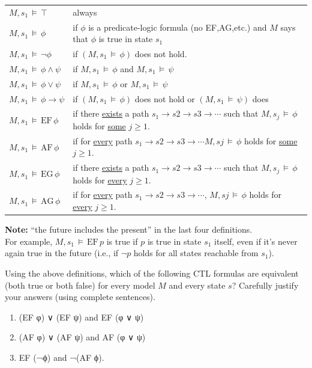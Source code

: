\documentclass[12pt,letterpaper,boxed,cm]{hmcpset}
\newcommand{\ra}[0]{\rightarrow}
\newcommand{\turn}[0]{\,\vDash\,}
\newcommand{\EF}[0]{\text{EF}\,}
\newcommand{\AF}[0]{\text{AF}\,}
\newcommand{\EG}[0]{\text{EG}\,}
\newcommand{\AG}[0]{\text{AG}\,}
\begin{document}
\begin{center}
    \begin{tabular}{l l}
        $M, s_1 \turn \top$           & always \\
        $M,s_1 \turn \phi$            & if $\phi$ is a predicate-logic formula (no EF,AG,etc.)
                                       and $M$ says that $\phi$ is true in state $s_1$ \\
        $M,s_1 \turn \neg\phi$        & if $(M,s_1 \turn \phi)$ does not hold. \\
        $M,s_1 \turn \phi \land \psi$ & if $M,s_1 \turn \phi$ and $M,s_1 \turn \psi$ \\
        $M,s_1 \turn \phi \lor \psi$  & if $ M,s_1 \turn \phi$ or $ M,s_1 \turn \psi$ \\
        $M,s_1 \turn \phi \ra \psi$   & if $(M,s_1 \turn \phi)$ does not hold or $(M,s_1 \turn \psi)$ does \\
        $M,s_1 \turn \EF \phi$        & if there \ul{exists} a path $s_1 \ra s2 \ra s3 \ra \cdots$  such that
                                       $M,s_j \turn \phi$  holds for \ul{some} $j \ge 1$. \\
        $M,s_1 \turn \AF \phi$        & if for \ul{every} path $s_1 \ra s2 \ra s3 \ra \cdots M,sj \turn \phi$ 
                                       holds for \ul{some} $j \ge 1$. \\
        $M,s_1 \turn \EG \phi$        & if there \ul{exists} a path $s_1 \ra s2 \ra s3 \ra \cdots$  such that
                                       $M,s_j \turn \phi$  holds for \ul{every} $j \ge 1$. \\
        $M,s_1 \turn \AG \phi$        & if for \ul{every} path $s_1 \ra s2 \ra s3 \ra \cdots$,  $M,sj \turn \phi$  
                                       holds for \ul{every} $j \ge 1$.
    \end{tabular}
\end{center}

\textbf{Note:}  ``the future includes the present'' in the last four definitions.\\
For example, $M,s_1 \turn \EF p$  is true if $p$ is true in state $s_1$ itself, 
even if it's never again true in the future (i.e., if $\neg p$ holds for all states reachable from $s_1$).
\newpage

\begin{problem}[1.]
    [15 points] Using the above definitions, which of the following CTL formulas are equivalent (both true or both false) for every model $M$ and every state $s$?  Carefully justify your answers (using complete sentences).
    \begin{enumerate}[label=\Alph*.]
        \item (EF φ) ∨ (EF ψ)   and    EF (φ ∨ ψ)
        \item (AF φ) ∨ (AF ψ)    and   AF (φ ∨ ψ)
        \item EF (¬ϕ)   and    ¬(AF ϕ).
    \end{enumerate}
\end{problem}
\end{document}
